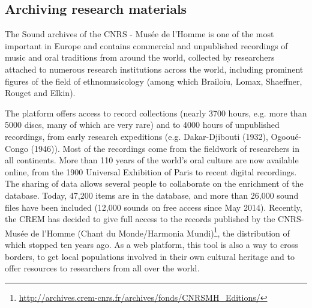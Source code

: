 \documentclass{sig-alternate}
\begin{document}
\subsection{Archiving research materials}
The Sound archives of the CNRS - Musée de l'Homme is one of the most important in Europe and contains commercial and unpublished recordings of music and oral traditions from around the world, collected by researchers attached to numerous research institutions across the world, including prominent figures of the field of ethnomusicology (among which Brailoiu, Lomax, Shaeffner, Rouget and Elkin). 

The platform offers access to record collections (nearly 3700 hours, e.g. more than 5000 discs, many of which are very rare) and to 4000 hours of unpublished recordings, from early research expeditions (e.g. Dakar-Djibouti (1932), Ogooué-Congo (1946)). Most of the recordings come from the fieldwork of researchers in all continents. 
More than 110 years of the world's oral culture are now available online, from the 1900 Universal Exhibition of Paris to recent digital recordings. The sharing of data allows several people to collaborate on the enrichment of the database. Today, 47,200 items are in the database, and more than 26,000 sound files have been included (12,000 sounds on free access since May 2014). Recently, the CREM has decided to give full access to the records published by the CNRS-Musée de l’Homme (Chant du Monde/Harmonia Mundi)\footnote{\url{http://archives.crem-cnrs.fr/archives/fonds/CNRSMH_Editions/}}, the distribution of which stopped ten years ago.
As a web platform, this tool is also a way to cross borders, to get local populations involved in their own cultural heritage and to offer resources to researchers from all over the world.
\end{document}
